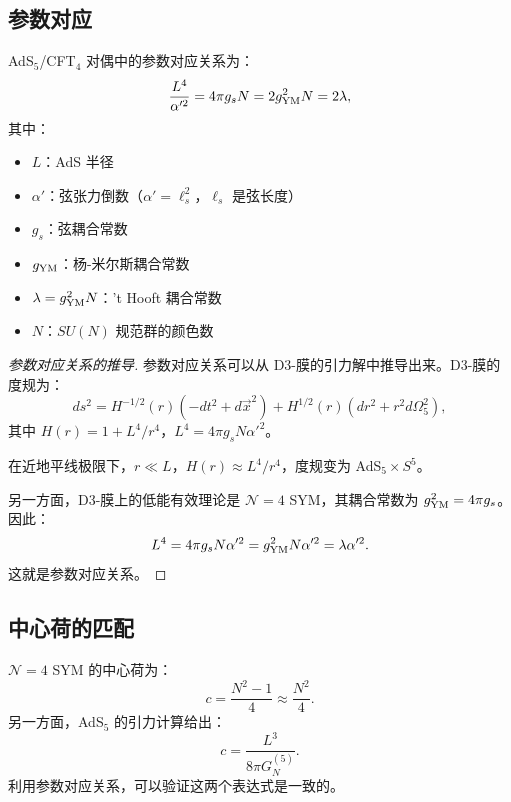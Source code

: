 \subsection{参数对应}

\begin{theorem}[参数对应关系]
AdS$_5$/CFT$_4$ 对偶中的参数对应关系为：
\begin{equation}
    \frac{L^4}{\alpha'^2} = 4\pi g_s N = 2g_{\rm YM}^2 N = 2\lambda,
\end{equation}
其中：
\begin{itemize}
    \item $L$：AdS 半径
    \item $\alpha'$：弦张力倒数（$\alpha' = \ell_s^2$，$\ell_s$ 是弦长度）
    \item $g_s$：弦耦合常数
    \item $g_{\rm YM}$：杨-米尔斯耦合常数
    \item $\lambda = g_{\rm YM}^2 N$：'t Hooft 耦合常数
    \item $N$：$SU(N)$ 规范群的颜色数
\end{itemize}
\end{theorem}

\begin{proof}[参数对应关系的推导]
参数对应关系可以从 D3-膜的引力解中推导出来。D3-膜的度规为：
\begin{equation}
    ds^2 = H^{-1/2}(r) (-dt^2 + d\vec{x}^2) + H^{1/2}(r) (dr^2 + r^2 d\Omega_5^2),
\end{equation}
其中 $H(r) = 1 + L^4/r^4$，$L^4 = 4\pi g_s N \alpha'^2$。

在近地平线极限下，$r \ll L$，$H(r) \approx L^4/r^4$，度规变为 AdS$_5 \times S^5$。

另一方面，D3-膜上的低能有效理论是 $\mathcal{N}=4$ SYM，其耦合常数为 $g_{\rm YM}^2 = 4\pi g_s$。因此：
\begin{equation}
    L^4 = 4\pi g_s N \alpha'^2 = g_{\rm YM}^2 N \alpha'^2 = \lambda \alpha'^2.
\end{equation}
这就是参数对应关系。
\end{proof}

\subsection{中心荷的匹配}

\begin{theorem}[中心荷匹配]
$\mathcal{N}=4$ SYM 的中心荷为：
\begin{equation}
    c = \frac{N^2 - 1}{4} \approx \frac{N^2}{4}.
\end{equation}
另一方面，AdS$_5$ 的引力计算给出：
\begin{equation}
    c = \frac{L^3}{8\pi G_N^{(5)}}.
\end{equation}
利用参数对应关系，可以验证这两个表达式是一致的。
\end{theorem}

